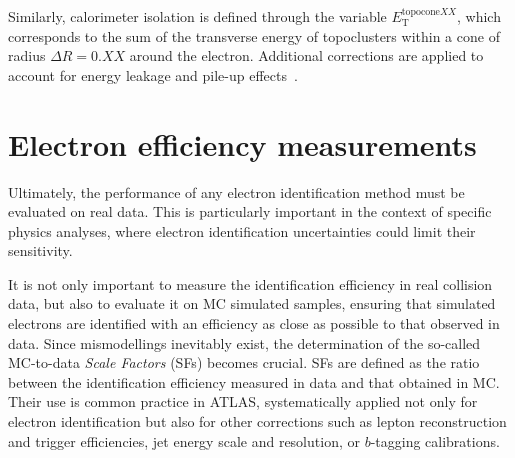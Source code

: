 Similarly, calorimeter isolation is defined through the variable $E_{\mathrm{T}}^{\mathrm{topocone}XX}$, which corresponds to the sum of the transverse energy of topoclusters within a cone of radius $\Delta R = 0.XX$ around the electron. Additional corrections are applied to account for energy leakage and pile-up effects~\cite{Aaboud:2657964}.
\section{Electron efficiency measurements}
\label{sec:electron_efficiency_measurements}

Ultimately, the performance of any electron identification method must be evaluated on real data. This is particularly important in the context of specific physics analyses, where electron identification uncertainties could limit their sensitivity.

It is not only important to measure the identification efficiency in real collision data, but also to evaluate it on MC simulated samples, ensuring that simulated electrons are identified with an efficiency as close as possible to that observed in data. Since mismodellings inevitably exist, the determination of the so-called MC-to-data \emph{Scale Factors} (SFs) becomes crucial. SFs are defined as the ratio between the identification efficiency measured in data and that obtained in MC. Their use is common practice in ATLAS, systematically applied not only for electron identification but also for other corrections such as lepton reconstruction and trigger efficiencies, jet energy scale and resolution, or $b$-tagging calibrations.

